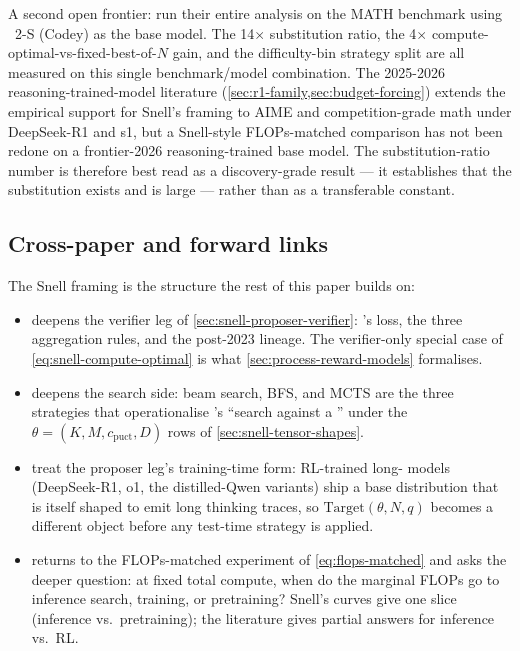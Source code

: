 A second open frontier: \citet[\S 4--6]{snell2024} run their entire
analysis on the MATH benchmark using ~2-S\* (Codey) as the base
model. The 14$\times$ substitution ratio, the 4$\times$
compute-optimal-vs-fixed-best-of-$N$ gain, and the difficulty-bin
strategy split are all measured on this single benchmark/model
combination. The 2025-2026 reasoning-trained-model literature
(\cref{sec:r1-family,sec:budget-forcing}) extends the empirical
support for Snell's framing to AIME and competition-grade math under
DeepSeek-R1 and s1, but a Snell-style FLOPs-matched comparison has not
been redone on a frontier-2026 reasoning-trained base model. The
substitution-ratio number is therefore best read as a discovery-grade
result --- it establishes that the substitution exists and is large ---
rather than as a transferable constant.

\subsection{Cross-paper and forward links}
\label{sec:snell-forward}

The Snell framing is the structure the rest of this paper builds on:
\begin{itemize}
\item {} deepens the verifier leg of
\cref{sec:snell-proposer-verifier}: \citet{lightman2023-prm800k}'s 
loss, the three aggregation rules, and the post-2023  lineage. The
verifier-only special case of
\cref{eq:snell-compute-optimal} is what
\cref{sec:process-reward-models} formalises.
\item {} deepens the search side: beam search, BFS,
and MCTS are the three strategies that operationalise
\citet[\S 5.2]{snell2024}'s ``search against a '' under the
$\theta = (K, M, c_\text{puct}, D)$ rows of
\cref{sec:snell-tensor-shapes}.
\item {} treat the proposer leg's
training-time form: RL-trained long- models (DeepSeek-R1, o1, the
distilled-Qwen variants) ship a base distribution that is itself
shaped to emit long thinking traces, so $\mathrm{Target}(\theta, N, q)$
becomes a different object before any test-time strategy is applied.
\item {} returns to the FLOPs-matched experiment
of \cref{eq:flops-matched} and asks the deeper question: at fixed total
compute, when do the marginal FLOPs go to inference search, 
training, or pretraining? Snell's curves give one slice
(inference vs.\ pretraining); the  literature gives partial
answers for inference vs.\ RL.
\end{itemize}

